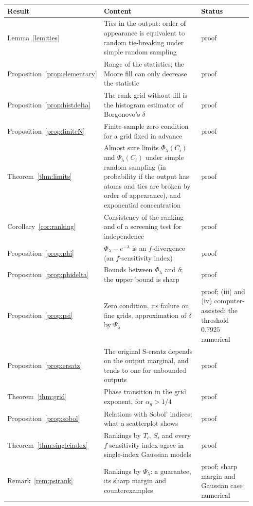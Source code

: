 \documentclass[11pt,a4paper]{article}
\theoremstyle{definition}
\theoremstyle{remark}
\begin{document}
\begin{table}[h]
\centering\small
\begin{tabular}{@{}>{\raggedright\arraybackslash}p{2.9cm}>{\raggedright\arraybackslash}p{8.1cm}>{\raggedright\arraybackslash}p{4.1cm}@{}}
\toprule
Result & Content & Status\\
\midrule
Lemma~\ref{lem:ties} & Ties in the output: order of appearance is equivalent to random tie-breaking under simple random sampling & proof\\
Proposition~\ref{prop:elementary} & Range of the statistics; the Moore fill can only decrease the statistic & proof\\
Proposition~\ref{prop:histdelta} & The rank grid without fill is the histogram estimator of Borgonovo's $\delta$ & proof\\
Proposition~\ref{prop:finiteN} & Finite-sample zero condition for a grid fixed in advance & proof\\
Theorem~\ref{thm:limits} & Almost sure limits $\Phi_\lambda(C_i)$ and $\Psi_\lambda(C_i)$ under simple random sampling (in probability if the output has atoms and ties are broken by order of appearance), and exponential concentration & proof\\
Corollary~\ref{cor:ranking} & Consistency of the ranking and of a screening test for independence & proof\\
Proposition~\ref{prop:phi} & $\Phi_\lambda-e^{-\lambda}$ is an $f$-divergence (an $f$-sensitivity index) & proof\\
Proposition~\ref{prop:phidelta} & Bounds between $\Phi_\lambda$ and $\delta$; the upper bound is sharp & proof\\
Proposition~\ref{prop:psi} & Zero condition, its failure on fine grids, approximation of $\delta$ by $\Psi_\lambda$ & proof; (iii) and (iv) computer-assisted; the threshold $0.7925$ numerical\\
Proposition~\ref{prop:ersatz} & The original S-ersatz depends on the output marginal, and tends to one for unbounded outputs & proof\\
Theorem~\ref{thm:grid} & Phase transition in the grid exponent, for $\alpha_g>1/4$ & proof\\
Proposition~\ref{prop:sobol} & Relations with Sobol' indices; what a scatterplot shows & proof\\
Theorem~\ref{thm:singleindex} & Rankings by $T_i$, $S_i$ and every $f$-sensitivity index agree in single-index Gaussian models & proof\\
Remark~\ref{rem:psirank} & Rankings by $\Psi_\lambda$: a guarantee, its sharp margin and counterexamples & proof; sharp margin and Gaussian case numerical\\

\end{tabular}
\end{table}
\end{document}
